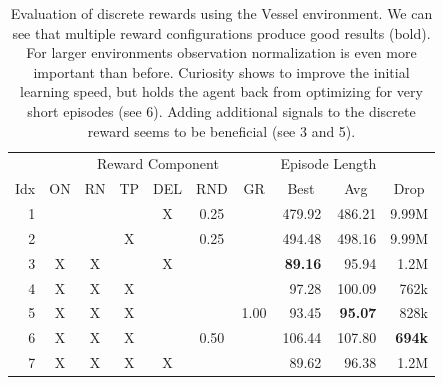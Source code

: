 \begin{table}[htp]
    \begin{center}
        \begin{tabular}{rccccccrrr}
            \toprule
             & \multicolumn{6}{c}{Reward Component} & \multicolumn{2}{c}{Episode Length} & \\
            \cmidrule(lr){2-7}\cmidrule(lr){8-9}
            \multicolumn{1}{c}{Idx} & \multicolumn{1}{c}{ON} & \multicolumn{1}{c}{RN} & \multicolumn{1}{c}{TP} & \multicolumn{1}{c}{DEL} & \multicolumn{1}{c}{RND} & \multicolumn{1}{c}{GR} & \multicolumn{1}{c}{Best} & \multicolumn{1}{c}{Avg} & \multicolumn{1}{c}{Drop}\\
            \midrule
            1 &  &  &  & X & 0.25 &  & 479.92 & 486.21 & 9.99M \\
            2 &  &  & X &  & 0.25 &  & 494.48 & 498.16 & 9.99M \\
            3 & X & X &  & X &  &  & \textbf{89.16} & 95.94 & 1.2M \\
            4 & X & X & X &  &  &  & 97.28 & 100.09 & 762k \\
            5 & X & X & X &  &  & 1.00 & 93.45 & \textbf{95.07} & 828k \\
            6 & X & X & X &  & 0.50 &  & 106.44 & 107.80 & \textbf{694k} \\
            7 & X & X & X & X &  &  & 89.62 & 96.38 & 1.2M \\
            \bottomrule
        \end{tabular}
    \end{center}
    \caption[Evaluation of Discrete Rewards using the Vessel Environment]{Evaluation of discrete rewards using the Vessel environment. We can see that multiple reward configurations produce good results (bold). For larger environments observation normalization is even more important than before. Curiosity shows to improve the initial learning speed, but holds the agent back from optimizing for very short episodes (see 6). Adding additional signals to the discrete reward seems to be beneficial (see 3 and 5).} \label{tab:VesselMaze02/Reward/Discrete}
\end{table}

